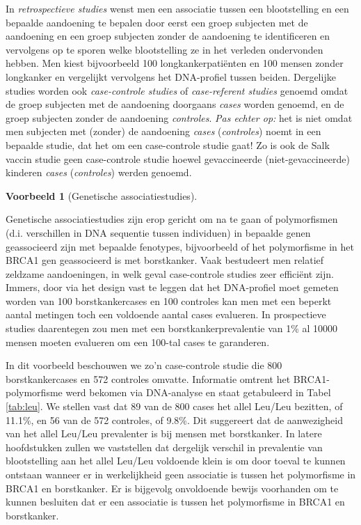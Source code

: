 \documentclass[
  12pt,dutch,coursenotes]{book}
\theoremstyle{definition}
\theoremstyle{definition}
\newtheorem{example}{Voorbeeld}[chapter]
\theoremstyle{definition}
\theoremstyle{remark}
\begin{document}
In \emph{retrospectieve studies} wenst men een associatie tussen een
blootstelling en een bepaalde aandoening te bepalen door eerst een groep
subjecten met de aandoening en een groep subjecten zonder de aandoening te
identificeren en vervolgens op te sporen welke blootstelling ze in het
verleden ondervonden hebben. Men kiest bijvoorbeeld 100
longkankerpatiënten en 100 mensen zonder longkanker en vergelijkt vervolgens het DNA-profiel tussen beiden. Dergelijke studies worden
ook \emph{case-controle studies} of \emph{case-referent studies} genoemd
omdat de groep subjecten met de aandoening doorgaans \emph{cases} worden genoemd,
en de groep subjecten zonder de aandoening \emph{controles}. \emph{Pas echter op:} het is niet omdat men subjecten met (zonder) de aandoening \emph{cases}
(\emph{controles}) noemt in een bepaalde studie, dat het om een case-controle
studie gaat! Zo is ook de Salk vaccin studie geen case-controle studie
hoewel gevaccineerde (niet-gevaccineerde) kinderen \emph{cases} (\emph{controles})
werden genoemd.

\begin{example}[Genetische associatiestudies]
\protect\hypertarget{exm:brcaLeu}{}{\label{exm:brcaLeu} \iffalse (Genetische associatiestudies) \fi{} }
\end{example}

Genetische associatiestudies zijn erop gericht om na te gaan of polymorfismen (d.i. verschillen in DNA sequentie tussen individuen) in bepaalde genen geassocieerd zijn met bepaalde fenotypes, bijvoorbeeld of het polymorfisme in het BRCA1 gen geassocieerd is met borstkanker. Vaak bestudeert men relatief zeldzame aandoeningen, in welk geval case-controle studies zeer efficiënt zijn. Immers, door via het design vast te leggen dat het DNA-profiel moet gemeten worden van 100 borstkankercases en 100 controles kan men met een beperkt aantal metingen toch een voldoende aantal cases evalueren. In prospectieve studies daarentegen zou men met een borstkankerprevalentie van 1\% al 10000 mensen moeten evalueren om een 100-tal cases te garanderen.

In dit voorbeeld beschouwen we zo'n case-controle studie die 800 borstkankercases en 572 controles omvatte. Informatie omtrent het BRCA1-polymorfisme werd bekomen via DNA-analyse en staat getabuleerd in Tabel \ref{tab:leu}.
We stellen vast dat 89 van de 800 cases het allel Leu/Leu bezitten, of 11.1\%, en 56 van de 572 controles, of 9.8\%. Dit suggereert dat de aanwezigheid van het allel Leu/Leu prevalenter is bij mensen met borstkanker. In latere hoofdstukken zullen
we vaststellen dat dergelijk verschil in prevalentie van blootstelling aan
het allel Leu/Leu voldoende klein is om door toeval te kunnen ontstaan wanneer er in
werkelijkheid geen associatie is tussen het polymorfisme in BRCA1 en borstkanker. Er is bijgevolg onvoldoende bewijs voorhanden om te kunnen besluiten dat er een associatie is tussen het polymorfisme in BRCA1 en borstkanker.
\end{document}
